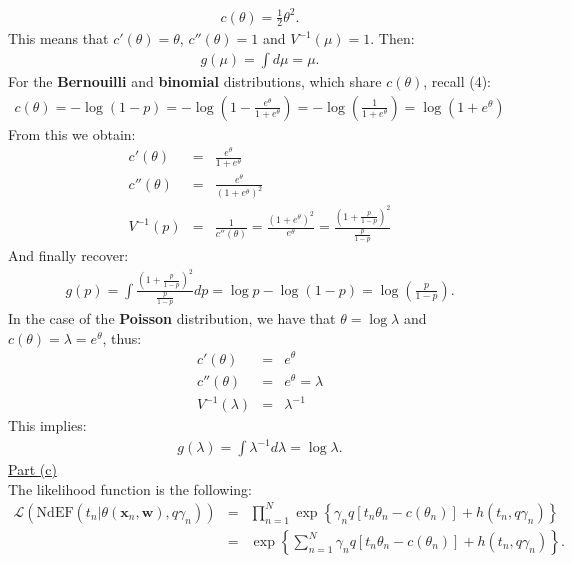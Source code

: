 \documentclass[a4paper, 11pt]{article}
\begin{document}
\begin{eqnarray}
c(\theta) = \frac{1}{2} \theta^2. \nonumber
\end{eqnarray}
This means that $c'(\theta) = \theta$, $c''(\theta) = 1$ and $V^{-1}(\mu) = 1$. Then:
\begin{eqnarray}
g(\mu) = \int d\mu = \mu. \nonumber
\end{eqnarray}
For the \textbf{Bernouilli} and \textbf{binomial} distributions, which share $c(\theta)$, recall (4):
\begin{eqnarray}
c(\theta) = -\log{(1-p)} = -\log{\left( 1 - \frac{e^\theta}{1+e^\theta} \right)} = -\log{\left( \frac{1}{1+e^\theta} \right)} = \log{(1 + e^\theta)} \nonumber
\end{eqnarray}
From this we obtain:
\begin{eqnarray}
c'(\theta) &=& \frac{e^\theta}{1 + e^\theta} \nonumber \\
c''(\theta) &=& \frac{e^\theta}{(1 + e^\theta)^2}\nonumber \\
V^{-1}(p) &=& \frac{1}{c''(\theta)} = \frac{(1 + e^\theta)^2}{e^\theta} = \frac{\left(1 + \frac{p}{1-p}\right)^2}{\frac{p}{1-p}} \nonumber
\end{eqnarray}
And finally recover:
\begin{eqnarray}
g(p) = \int \frac{(1 + \frac{p}{1-p})^2}{\frac{p}{1-p}} dp = \log p - \log{(1-p)} = \log{\left(\frac{p}{1-p}\right)}. \nonumber
\end{eqnarray}
In the case of the \textbf{Poisson} distribution, we have that $\theta = \log \lambda$ and $c(\theta) = \lambda = e^{\theta}$, thus:
\begin{eqnarray}
c'(\theta) &=& e^{\theta} \nonumber \\
c''(\theta) &=& e^{\theta}  = \lambda \nonumber \\
V^{-1}(\lambda) &=& \lambda^{-1} \nonumber
\end{eqnarray}
This implies:
\begin{eqnarray}
g(\lambda) = \int \lambda^{-1} d\lambda = \log \lambda. \nonumber
\end{eqnarray}
\newline \underline{Part (c)}\\
\newline The likelihood function is the following:
\begin{eqnarray}
\mathcal{L} \left( \text{NdEF}( t_n | \theta (\mathbf{x}_n, \mathbf{w}), q \gamma_n ) \right) &=& \prod_{n=1}^{N} \exp \left\{ \gamma_n q [ t_n \theta_n - c(\theta_n) ] + h(t_n, q \gamma_n) \right\} \nonumber \\
&=& \exp \left\{ \sum_{n=1}^{N} \gamma_n q [ t_n \theta_n - c(\theta_n) ] + h(t_n, q \gamma_n) \right\}. \nonumber
\end{eqnarray}
\end{document}
